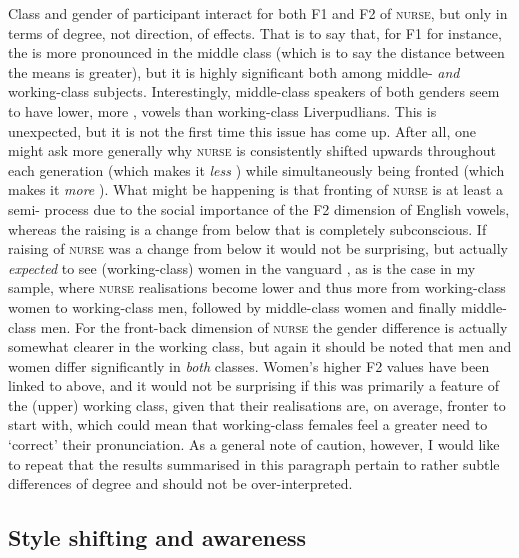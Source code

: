 Class and gender of participant interact for both F1 and F2 of \textsc{nurse}, but only in terms of degree, not direction, of effects.
That is to say that, for F1 for instance, the  is more pronounced in the middle class (which is to say the distance between the means is greater), but it is highly significant both among middle- \emph{and} working-class subjects.
Interestingly, middle-class speakers of both genders seem to have lower, more , vowels than working-class Liverpudlians.
This is unexpected, but it is not the first time this issue has come up.
After all, one might ask more generally why \textsc{nurse} is consistently shifted upwards throughout each generation (which makes it \emph{less} ) while simultaneously being fronted (which makes it \emph{more} ).
What might be happening is that fronting of \textsc{nurse} is at least a semi- process due to the social importance of the F2 dimension of English vowels, whereas the raising is a change from below that is completely subconscious.
If raising of \textsc{nurse} was a change from below it would not be surprising, but actually \emph{expected} to see (working-class) women in the vanguard \parencite[cf.][292--293]{labov2001a}, as is the case in my sample, where \textsc{nurse} realisations become lower and thus more  from working-class women to working-class men, followed by middle-class women and finally middle-class men.
For the front-back dimension of \textsc{nurse} the gender difference is actually somewhat clearer in the working class, but again it should be noted that men and women differ significantly in \emph{both} classes.
Women's higher F2 values have been linked to  above, and it would not be surprising if this was primarily a feature of the (upper) working class, given that their realisations are, on average, fronter to start with, which could mean that working-class females feel a greater need to `correct' their pronunciation.
As a general note of caution, however, I would like to repeat that the results summarised in this paragraph pertain to rather subtle differences of degree and should not be over-interpreted.

\subsection{Style shifting and awareness}
\label{prod.disc.nurse.style}

